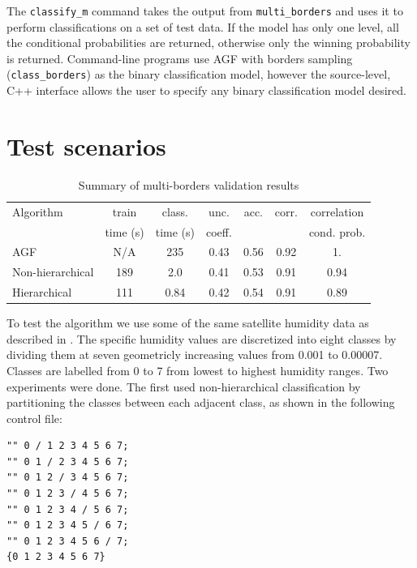 The \verb/classify_m/ command takes the output from \verb/multi_borders/
and uses it to perform classifications on a set of test data.
If the model has only one level, all the conditional probabilities are returned, 
otherwise only the winning probability is returned.
Command-line programs use AGF with borders sampling (\verb/class_borders/) 
as the binary classification model, however the source-level, C++ interface 
allows the user to specify any binary classification model desired.

\section{Test scenarios}

\begin{table}
\caption{Summary of multi-borders validation results}
  \begin{center}
     \begin{tabular}{|l|cccccc|} \hline
       Algorithm & train    & class.   & unc.   & acc. & corr. & correlation \\
                 & time (s) & time (s) & coeff. &      &       & cond. prob. \\ \hline\hline
AGF              & N/A & 235  & 0.43 & 0.56 & 0.92 & 1.   \\
Non-hierarchical & 189 & 2.0  & 0.41 & 0.53 & 0.91 & 0.94 \\
Hierarchical     & 111 & 0.84 & 0.42 & 0.54 & 0.91 & 0.89 \\
\hline
    \end{tabular}
  \end{center}
\label{multiclass_results}
\end{table}

To test the algorithm we use some of the same satellite humidity data as
described in \citet{Mills2009}.  
The specific humidity values are discretized into eight
classes by dividing them at seven geometricly increasing values from
0.001 to 0.00007.  Classes are labelled from 0 to 7 from lowest to highest
humidity ranges.  Two experiments were done.  The first used non-hierarchical
classification by partitioning the classes between each adjacent class, as
shown in the following control file:

\begin{verbatim}
"" 0 / 1 2 3 4 5 6 7;
"" 0 1 / 2 3 4 5 6 7;
"" 0 1 2 / 3 4 5 6 7;
"" 0 1 2 3 / 4 5 6 7;
"" 0 1 2 3 4 / 5 6 7;
"" 0 1 2 3 4 5 / 6 7;
"" 0 1 2 3 4 5 6 / 7;
{0 1 2 3 4 5 6 7}
\end{verbatim}

